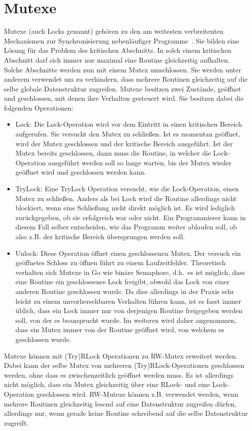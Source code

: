 \section{Mutexe}\label{Chap:Back-Sec:Mutex}
Mutexe (auch Locks genannt) gehören zu den am weitesten verbreitenten Mechanismen 
zur Synchronisierung nebenläufiger Programme~\cite{Undead}. Sie bilden 
eine Lösung für das Problem des kritischen Abschnitts. In solch einem 
kritischen Abschnitt darf sich immer nur maximal eine Routine gleichzeitig
aufhalten. Solche Abschnitte werden nun mit einem Mutex umschlossen. 
Sie werden unter anderem verwendet um zu verhindern, dass 
mehrere Routinen gleichzeitig auf die selbe globale Datenstruktur 
zugreifen. Mutexe besitzen zwei Zustände, geöffnet und geschlossen, mit denen 
ihre Verhalten gesteuert wird.
Sie besitzen dabei die folgenden Operationen:
\begin{itemize}
  \item Lock: Die Lock-Operation wird vor dem Eintritt in einen kritischen 
    Bereich aufgerufen. Sie versucht den Mutex zu schließen. Ist es momentan 
    geöffnet, wird der Mutex geschlossen und der kritische
    Bereich ausgeführt. Ist der Mutex bereits geschlossen, dann muss 
    die Routine, in welcher die Lock-Operation ausgeführt 
    werden soll so lange warten, bis der Mutex wieder geöffnet wird und 
    geschlossen werden kann.
  \item TryLock: Eine TryLock Operation versucht, wie die Lock-Operation,
    einen Mutex zu schließen. Anders als bei Lock wird die Routine allerdings 
    nicht blockiert, wenn eine Schließung nicht direkt möglich ist. Es wird 
    lediglich zurückgegeben, ob sie erfolgreich war oder nicht. Ein Programmierer 
    kann in diesem Fall selber entscheiden, wie das Programm weiter ablaufen 
    soll, ob also z.B. der kritische Bereich übersprungen werden soll.
  \item Unlock: Diese Operation öffnet einen geschlossenen Mutex. Der versuch ein 
    geöffnetes Schloss zu öffnen führt zu einem Laufzeitfehler. 
    Theoretisch verhalten sich Mutexe in Go wie binäre Semaphore, d.h.~es ist möglich, 
    dass eine Routine ein 
    geschlossenes Lock freigibt, obwohl das Lock von einer anderen Routine
    geschlossen wurde. Da dies allerdings in der Praxis sehr leicht zu einem 
    unvorhersehbaren Verhalten führen kann, ist es fasst immer üblich, 
    dass ein Lock immer nur von derjenigen Routine freigegeben werden
    soll, von der es beansprucht wurde. Im weiteren wird daher angenommen, 
    dass ein Mutex immer von der Routine geöffnet wird, von welchem es 
    geschlossen wurde.
\end{itemize}
Mutexe können mit (Try)RLock Operationen zu RW-Mutex erweitert werden.
Dabei kann der selbe Mutex von mehreren 
(Try)RLock-Operationen geschlossen werden, ohne dass es zwischenzeitlich
geöffnet werden muss. Es ist allerdings 
nicht möglich, dass ein Mutex gleichzeitig über eine RLock- und eine Lock-Operation 
geschlossen wird. RW-Mutexe können z.B. verwendet werden, wenn mehrere Routinen 
gleichzeitig lesend auf eine Datenstruktur zugreifen dürfen, allerdings nur, 
wenn gerade keine Routine schreibend auf die selbe Datenstruktur zugreift.


